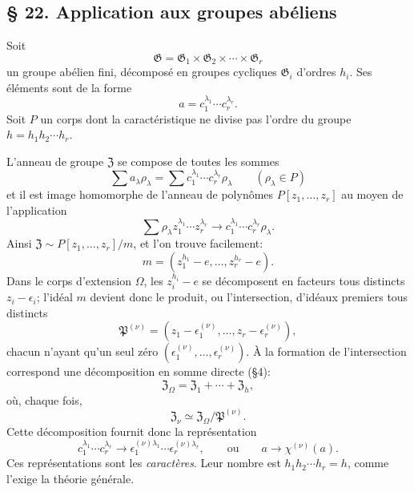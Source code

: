
\providecommand{\mG}{\mathfrak{G}}
\providecommand{\mP}{\mathfrak{P}}
\providecommand{\mZ}{\mathfrak{Z}}

\subsection*{\S{} 22. Application aux groupes abéliens}
Soit
\[
        \mG=\mG_1\times\mG_2\times\cdots\times\mG_r
\]
un groupe abélien fini, décomposé en groupes cycliques $\mG_i$ d'ordres $h_i$. Ses éléments sont de la forme
\[
        a=c_1^{\lambda_1}\cdots c_r^{\lambda_r}.
\]
Soit $P$ un corps dont la caractéristique ne divise pas l'ordre du groupe $h=h_1h_2\cdots h_r$.

L'anneau de groupe $\mZ$ se compose de toutes les sommes
\[
        \sum a_\lambda\rho_\lambda
        =
        \sum c_1^{\lambda_1}\cdots c_r^{\lambda_r}\rho_\lambda
        \qquad(\rho_\lambda\in P)
\]
et il est image homomorphe de l'anneau de polynômes $P[z_1,\ldots,z_r]$ au moyen de l'application
\[
        \sum \rho_\lambda z_1^{\lambda_1}\cdots z_r^{\lambda_r}
        \to
        c_1^{\lambda_1}\cdots c_r^{\lambda_r}\rho_\lambda.
\]
Ainsi $\mZ\sim P[z_1,\ldots,z_r]/m$, et l'on trouve facilement:
\[
        m=(z_1^{h_1}-e,\ldots,z_r^{h_r}-e).
\]
Dans le corps d'extension $\Omega$, les $z_i^{h_i}-e$ se décomposent en facteurs tous distincts $z_i-\epsilon_i$; l'idéal $m$ devient donc le produit, ou l'intersection, d'idéaux premiers tous distincts
\[
        \mP^{(\nu)}=(z_1-\epsilon_1^{(\nu)},\ldots,z_r-\epsilon_r^{(\nu)}),
\]
chacun n'ayant qu'un seul zéro $(\epsilon_1^{(\nu)},\ldots,\epsilon_r^{(\nu)})$. À la formation de l'intersection correspond une décomposition en somme directe (\S{}4):
\[
        \mZ_\Omega=\mZ_1+\cdots+\mZ_h,
\]
où, chaque fois,
\[
        \mZ_\nu\simeq\mZ_\Omega/\mP^{(\nu)}.
\]
Cette décomposition fournit donc la représentation
\[
        c_1^{\lambda_1}\cdots c_r^{\lambda_r}
        \to
        \epsilon_1^{(\nu)\lambda_1}\cdots\epsilon_r^{(\nu)\lambda_r},
        \qquad\text{ou}\qquad
        a\to\chi^{(\nu)}(a).
\]
Ces représentations sont les \emph{caractères}. Leur nombre est $h_1h_2\cdots h_r=h$, comme l'exige la théorie générale.
